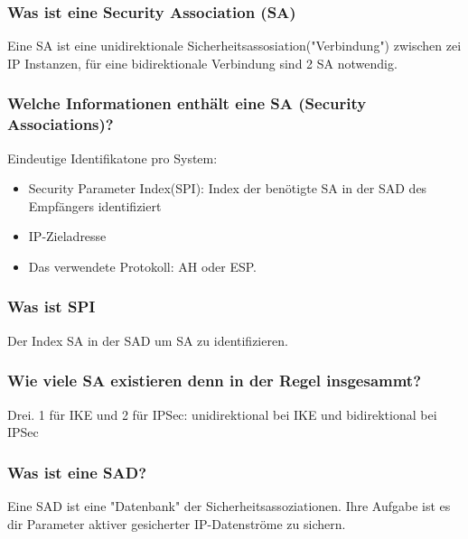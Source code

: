 	\subsubsection{Was ist eine Security Association (SA)}
	Eine SA ist eine unidirektionale Sicherheitsassosiation("Verbindung") zwischen zei IP Instanzen, für eine bidirektionale Verbindung sind 2 SA notwendig.
	
		\subsubsection{Welche Informationen enthält eine SA (Security Associations)?} %
	
	Eindeutige Identifikatone pro System:
	\begin{itemize}
		\item Security Parameter Index(SPI):  Index der benötigte SA in der SAD des Empfängers identifiziert
		\item IP-Zieladresse
		\item Das verwendete Protokoll: AH oder ESP.
	\end{itemize}
	
	
	\subsubsection{Was ist SPI}
	Der Index SA in der SAD um SA zu identifizieren.
	
	\subsubsection{Wie viele SA existieren denn in der Regel insgesammt?}
	Drei. 1 für IKE und 2 für IPSec: unidirektional bei IKE und bidirektional bei IPSec
	
	\subsubsection{Was ist eine SAD?}
	Eine SAD ist eine "Datenbank" der Sicherheitsassoziationen. Ihre Aufgabe ist es dir Parameter aktiver gesicherter IP-Datenströme zu sichern.
	
